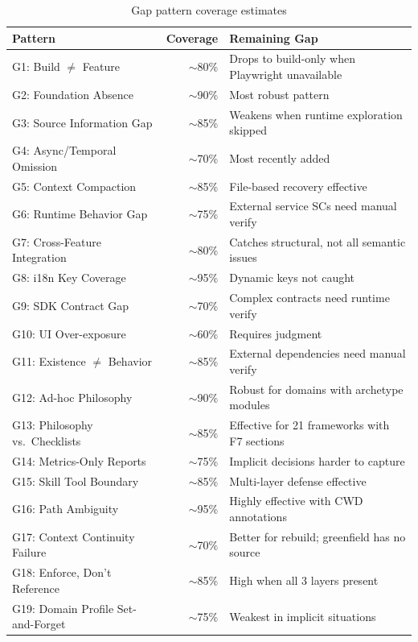 \documentclass[11pt,a4paper,openright,twoside]{report}
\begin{document}
\begin{table}[H]
\centering
\caption{Gap pattern coverage estimates}
\label{tab:gap-coverage}
\begin{tabularx}{\textwidth}{lrX}
\toprule
\textbf{Pattern} & \textbf{Coverage} & \textbf{Remaining Gap} \\
\midrule
G1: Build $\neq$ Feature & $\sim$80\% & Drops to build-only when Playwright unavailable \\
G2: Foundation Absence & $\sim$90\% & Most robust pattern \\
G3: Source Information Gap & $\sim$85\% & Weakens when runtime exploration skipped \\
G4: Async/Temporal Omission & $\sim$70\% & Most recently added \\
G5: Context Compaction & $\sim$85\% & File-based recovery effective \\
G6: Runtime Behavior Gap & $\sim$75\% & External service SCs need manual verify \\
G7: Cross-Feature Integration & $\sim$80\% & Catches structural, not all semantic issues \\
G8: i18n Key Coverage & $\sim$95\% & Dynamic keys not caught \\
G9: SDK Contract Gap & $\sim$70\% & Complex contracts need runtime verify \\
G10: UI Over-exposure & $\sim$60\% & Requires judgment \\
G11: Existence $\neq$ Behavior & $\sim$85\% & External dependencies need manual verify \\
G12: Ad-hoc Philosophy & $\sim$90\% & Robust for domains with archetype modules \\
G13: Philosophy vs.\ Checklists & $\sim$85\% & Effective for 21 frameworks with F7 sections \\
G14: Metrics-Only Reports & $\sim$75\% & Implicit decisions harder to capture \\
G15: Skill Tool Boundary & $\sim$85\% & Multi-layer defense effective \\
G16: Path Ambiguity & $\sim$95\% & Highly effective with CWD annotations \\
G17: Context Continuity Failure & $\sim$70\% & Better for rebuild; greenfield has no source \\
G18: Enforce, Don't Reference & $\sim$85\% & High when all 3 layers present \\
G19: Domain Profile Set-and-Forget & $\sim$75\% & Weakest in implicit situations \\
\bottomrule
\end{tabularx}
\end{table}
\end{document}
